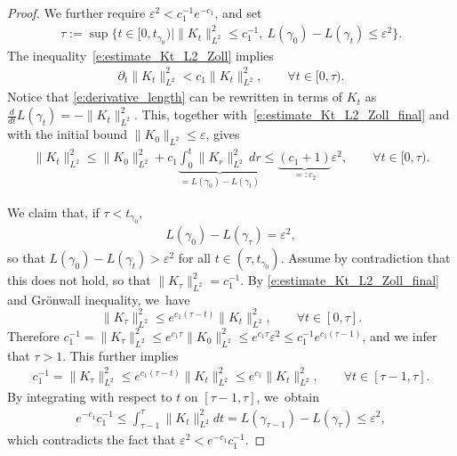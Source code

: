 \documentclass[11pt]{article}
\let\sep\mid
\let\epsilon\varepsilon
\theoremstyle{plain}
\theoremstyle{definition}
\begin{document}
\begin{proof}
We further require $\epsilon^2< c_1^{-1}e^{-c_1}$, and set
\begin{align*}
\tau:=\sup\big\{ t\in[0,t_{\gamma_0})\sep \|K_t\|_{L^2}^2\leq c_1^{-1},\ L(\gamma_0)-L(\gamma_t)\leq\epsilon^2 \big\}.
\end{align*}
The inequality~\eqref{e:estimate_Kt_L2_Zoll} implies
\begin{align}\label{e:estimate_Kt_L2_Zoll_final}
\partial_t \|K_t\|_{L^2}^2
<
c_1 \|K_t\|_{L^2}^2,
\qquad \forall t\in[0,\tau).
\end{align}
Notice that \eqref{e:derivative_length} can be rewritten in terms of $K_t$ as
$\tfrac{d}{dt} L(\gamma_t) = -\|K_t\|_{L^2}^2$. This, togeth\-er with~\eqref{e:estimate_Kt_L2_Zoll_final} and with the initial bound $\|K_{0}\|_{L^2}\leq\epsilon$, gives
\begin{align*}
\|K_{t}\|_{L^2}^2
\leq
\|K_{0}\|_{L^2}^2
+c_1\underbrace{\int_0^t \|K_{r}\|_{L^2}^2\,dr}_{=L(\gamma_0)-L(\gamma_t)}
\leq
\underbrace{(c_1+1)}_{=:c_2}\epsilon^2,\qquad
\forall t\in[0,\tau).
\end{align*}

We claim that, if $\tau<t_{\gamma_0}$,
\begin{align*}
L(\gamma_0)-L(\gamma_\tau)=\epsilon^2,
\end{align*}
so that $L(\gamma_0)-L(\gamma_t)>\epsilon^2$ for all $t\in(\tau,t_{\gamma_0})$.
Assume by contradiction that this does not hold, so that $\|K_\tau\|_{L^2}^2= c_1^{-1}$.
By \eqref{e:estimate_Kt_L2_Zoll_final} and Grönwall inequality, we~have
\[
\|K_{\tau}\|_{L^2}^2 \leq e^{c_1(\tau-t)} \|K_{t}\|_{L^2}^2,\qquad\forall t\in[0,\tau].
\]
Therefore
$c_1^{-1}=\|K_{\tau}\|_{L^2}^2\leq e^{c_1\tau}\|K_0\|_{L^2}^2\leq e^{c_1\tau}\epsilon^2\leq c_1^{-1}e^{c_1(\tau-1)}$,
and we infer that $\tau>1$.
This further implies
\begin{align*}
c_1^{-1} = \|K_{\tau}\|_{L^2}^2 \leq e^{c_1(\tau-t)} \|K_{t}\|_{L^2}^2 \leq e^{c_1} \|K_{t}\|_{L^2}^2,\qquad\forall t\in[\tau-1,\tau].
\end{align*}
By integrating with respect to $t$ on $[\tau-1,\tau]$, we~obtain
\begin{align*}
e^{-c_1}c_1^{-1}
\leq
\int_{\tau-1}^{\tau} \|K_{t}\|_{L^2}^2dt
=
L(\gamma_{\tau-1})- L(\gamma_{\tau})
\leq
\epsilon^2,
\end{align*}
which contradicts the fact that $\epsilon^2<e^{-c_1}c_1^{-1}$.


\end{proof}
\end{document}
